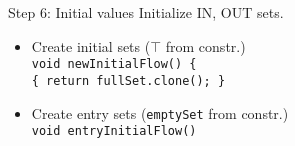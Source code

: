 

\begin{slide}{Step 6: Initial values}
\vspace*{-0.1in}
Initialize IN, OUT sets.
\begin{itemize}

\item Create initial sets ($\top$ from constr.)\\
{\tt void newInitialFlow() \{\\
\qquad \tt \{ return fullSet.clone(); \} }

\vspace*{0.1in}

\item Create entry sets ({\tt emptySet} from constr.)\\
{\tt void entryInitialFlow()}\\
\end{itemize}
\end{slide}



